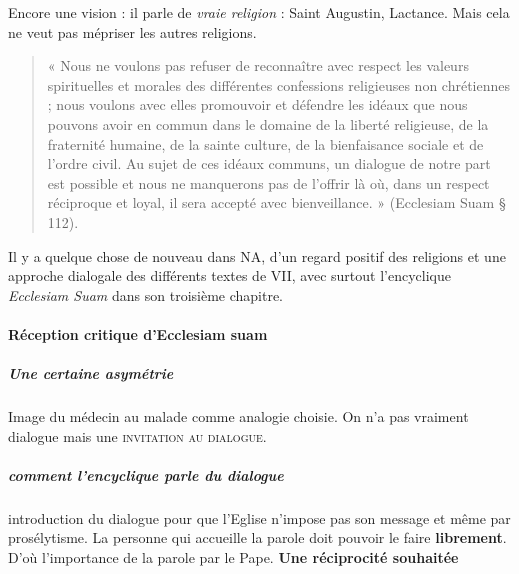    Encore une vision : il parle de \textit{vraie religion} : Saint Augustin, Lactance. Mais cela ne veut pas mépriser les autres religions. 
   
   \begin{quote}
       « Nous ne voulons pas refuser de reconnaître avec respect les valeurs spirituelles et morales des différentes confessions religieuses non chrétiennes ; nous voulons avec elles promouvoir et défendre les idéaux que nous pouvons avoir en commun dans le domaine de la liberté religieuse, de la fraternité humaine, de la sainte culture, de la bienfaisance sociale et de l'ordre civil. Au sujet de ces idéaux communs, un dialogue de notre part est possible et nous ne manquerons pas de l'offrir là où, dans un respect réciproque et loyal, il sera accepté avec bienveillance. » (Ecclesiam Suam § 112). 
   \end{quote}

\begin{Synthesis}
   Il y a quelque chose de nouveau dans NA, d'un regard positif des religions et une approche dialogale des différents textes de VII, avec surtout l'encyclique \textit{Ecclesiam Suam} dans son troisième chapitre.
\end{Synthesis}   
   
\paragraph{ Réception critique d’Ecclesiam suam }
   
   \subparagraph{Une certaine asymétrie} Image du médecin au malade comme analogie choisie. On n'a pas vraiment dialogue mais une \textsc{invitation au dialogue}. 
   
   \subparagraph{comment l'encyclique parle du dialogue} introduction du dialogue pour que l'Eglise n'impose pas son message et même par prosélytisme. 
   La personne qui accueille la parole doit pouvoir le faire \textbf{librement}. D'où l'importance de la parole par le Pape.
   \textbf{Une réciprocité souhaitée}
   

